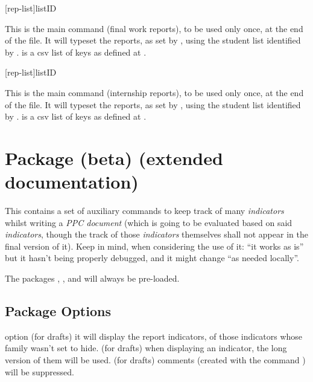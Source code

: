\documentclass[article,nogeometry,english,tocdepth=3,secdepth=3]{ufrgscca} %
\begin{document}
\begin{codedescribe}{\tcreports}
	\begin{codesyntax}%
		\tsmacro{\tcreports}[rep-list]{listID}
	\end{codesyntax}
	This is the main command (final work reports), to be used only once, at the end of the file. It will typeset the reports, as set by \tsmacro{\setreports}{}, using the student list identified by \tsobj[meta]{listID}.
     is a csv list of keys as defined at .
\end{codedescribe}

\begin{codedescribe}{\internshipreports}
    \begin{codesyntax}%
        \tsmacro{\internshipreports}[rep-list]{listID}
    \end{codesyntax}
    This is the main command (internship reports), to be used only once, at the end of the file. It will typeset the reports, as set by \tsmacro{\setreports}{}, using the student list identified by .
     is a csv list of keys as defined at .
\end{codedescribe}

\section{ Package (beta) (extended documentation)}
This contains a set of auxiliary commands to keep track of many \emph{indicators} whilst writing  a \emph{PPC document} (which is going to be evaluated based on said \emph{indicators}, though the track of those \emph{indicators} themselves shall not appear in the final version of it). Keep in mind, when considering the use of it: “it works as is” but it hasn't being properly debugged, and it might change “as needed locally”.

The packages , ,  and  will always be pre-loaded.

\subsection{Package Options}
\begin{describelist}{option}
 { (for drafts) it will display the report indicators, of those indicators whose family wasn't set to hide.}
 { (for drafts) when displaying an indicator, the long version of them will be used.}
 { (for drafts) comments (created with the command \tsmacro{\comment}) will be suppressed.}
\end{describelist}
\end{document}
